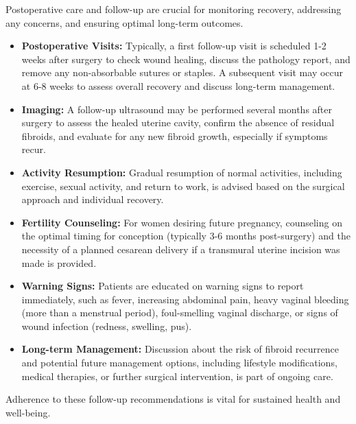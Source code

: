 Postoperative care and follow-up are crucial for monitoring recovery, addressing any concerns, and ensuring optimal long-term outcomes.

\begin{itemize}
  \item \textbf{Postoperative Visits:} Typically, a first follow-up visit is scheduled 1-2 weeks after surgery to check wound healing, discuss the pathology report, and remove any non-absorbable sutures or staples. A subsequent visit may occur at 6-8 weeks to assess overall recovery and discuss long-term management.
  
  \item \textbf{Imaging:} A follow-up ultrasound may be performed several months after surgery to assess the healed uterine cavity, confirm the absence of residual fibroids, and evaluate for any new fibroid growth, especially if symptoms recur.
  
  \item \textbf{Activity Resumption:} Gradual resumption of normal activities, including exercise, sexual activity, and return to work, is advised based on the surgical approach and individual recovery.
  
  \item \textbf{Fertility Counseling:} For women desiring future pregnancy, counseling on the optimal timing for conception (typically 3-6 months post-surgery) and the necessity of a planned cesarean delivery if a transmural uterine incision was made is provided.
  
  \item \textbf{Warning Signs:} Patients are educated on warning signs to report immediately, such as fever, increasing abdominal pain, heavy vaginal bleeding (more than a menstrual period), foul-smelling vaginal discharge, or signs of wound infection (redness, swelling, pus).
  
  \item \textbf{Long-term Management:} Discussion about the risk of fibroid recurrence and potential future management options, including lifestyle modifications, medical therapies, or further surgical intervention, is part of ongoing care.
\end{itemize}

Adherence to these follow-up recommendations is vital for sustained health and well-being.

